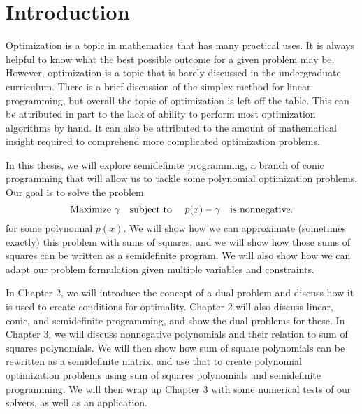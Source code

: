 
\chapter{Introduction}

Optimization is a topic in mathematics that has many practical uses. It is always helpful to know what the best possible outcome for a given problem may be. However, optimization is a topic that is barely discussed in the undergraduate curriculum. There is a brief discussion of the simplex method for linear programming, but overall the topic of optimization is left off the table. This can be attributed in part to the lack of ability to perform most optimization algorithms by hand. It can also be attributed to the amount of mathematical insight required to comprehend more complicated optimization problems.

In this thesis, we will explore semidefinite programming, a branch of conic programming that will allow us to tackle some polynomial optimization problems. Our goal is to solve the problem 
\begin{equation} 
	\textnormal{Maximize } \gamma \quad \textnormal{subject to } \quad p(x) - \gamma \quad \textnormal{is nonnegative}.
\end{equation}
for some polynomial $p(x)$. We will show how we can approximate (sometimes exactly) this problem with sums of squares, and we will show how those sums of squares can be written as a semidefinite program. We will also show how we can adapt our problem formulation given multiple variables and constraints. 

In Chapter 2, we will introduce the concept of a dual problem and discuss how it is used to create conditions for optimality. Chapter 2 will also discuss linear, conic, and semidefinite programming, and show the dual problems for these. In Chapter 3, we will discuss nonnegative polynomials and their relation to sum of squares polynomials. We will then show how sum of square polynomials can be rewritten as a semidefinite matrix, and use that to create polynomial optimization problems using sum of squares polynomials and semidefinite programming. We will then wrap up Chapter 3 with some numerical tests of our solvers, as well as an application. 